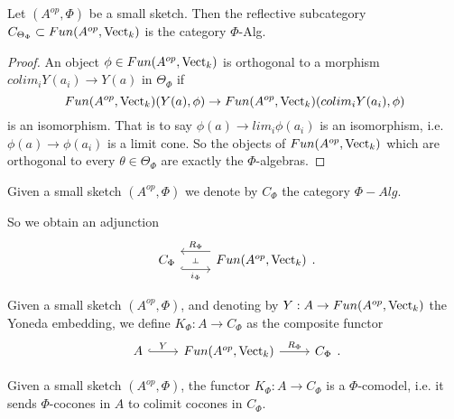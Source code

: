 \begin{lemma}\cite[Theorem 6.11]{kelly/basic-concepts-enriched}
  Let $(A^{op},\Phi)$ be a small sketch. Then the reflective subcategory
  $C_{\Theta_{\Phi}}\subset Fun(A^{op},\operatorname{Vect}_k)$ is the category $\Phi$-Alg.
\end{lemma}

\begin{proof}
  An object $\phi \in Fun(A^{op},\operatorname{Vect}_k)$ is orthogonal to a morphism
  $colim_i Y(a_i)\to Y(a)$ in $\Theta_{\Phi}$
  if $$Fun(A^{op},\operatorname{Vect}_k)(Y(a),\phi)\to Fun(A^{op},\operatorname{Vect}_k)(colim_i
  Y(a_i),\phi)$$ is an isomorphism. That is to say $\phi(a)\to lim_i
  \phi(a_i)$ is an isomorphism, i.e. $\phi(a)\to \phi(a_i)$ is a limit cone.
  So the objects of $Fun(A^{op},\operatorname{Vect}_k)$ which are orthogonal to every
  $\theta\in \Theta_{\Phi}$ are exactly the $\Phi$-algebras.
\end{proof}

\begin{definition}

  \noindent Given a small sketch $(A^{op},\Phi)$ we denote by $C_{\Phi}$ the
  category $\Phi-Alg$.
\end{definition}


So we obtain an adjunction
\[\begin{tikzcd}
            {C_{\Phi}} & {Fun(A^{op},\Vect_k)}
            \arrow[""{name=0, anchor=center, inner sep=0}, "i_{\Phi}"', shift right=3, hook, from=1-1, to=1-2]
            \arrow[""{name=1, anchor=center, inner sep=0}, "R_{\Phi}"', shift right=3, from=1-2, to=1-1]
            \arrow["\dashv"{anchor=center, rotate=-90}, draw=none, from=1, to=0]
\end{tikzcd}.
\]

\begin{definition}

  \noindent Given a small sketch $(A^{op},\Phi)$, and denoting by $Y:A\to
  Fun(A^{op},\operatorname{Vect}_k)$ the Yoneda embedding, we define $K_{\Phi}:A\to
  C_{\Phi}$ as the composite functor
  \[
    \begin{tikzcd} A &
    {Fun(A^{op},\Vect_k)} & {C_{\Phi}} \arrow["Y", hook, from=1-1, to=1-2]
    \arrow["R_{\Phi}", from=1-2, to=1-3]
    \end{tikzcd}.
  \]
\end{definition}

\begin{lemma}

  \noindent Given a small sketch $(A^{op},\Phi)$, the functor $K_{\Phi}:A\to
  C_{\Phi}$ is a $\Phi$-comodel, i.e. it sends $\Phi$-cocones in $A$ to
  colimit cocones in $C_{\Phi}$.
\end{lemma}

